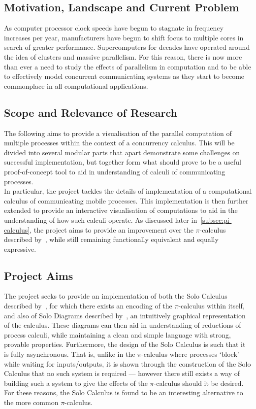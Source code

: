 \subsection{Motivation, Landscape and Current Problem}

    As computer processor clock speeds have begun to stagnate in frequency increases per year, manufacturers have begun to shift focus to multiple cores in search of greater performance.
    Supercomputers for decades have operated around the idea of clusters and massive parallelism.
    For this reason, there is now more than ever a need to study the effects of parallelism in computation and to be able to effectively model concurrent communicating systems as they start to become commonplace in all computational applications.


\subsection{Scope and Relevance of Research}

    The following aims to provide a visualisation of the parallel computation of multiple processes within the context of a concurrency calculus.
    This will be divided into several modular parts that apart demonstrate some challenges on successful implementation, but together form what should prove to be a useful proof-of-concept tool to aid in understanding of calculi of communicating processes.\\

    In particular, the project tackles the details of implementation of a computational calculus of communicating mobile processes.
    This implementation is then further extended to provide an interactive visualisation of computations to aid in the understanding of how such calculi operate.
    As discussed later in~\ref{subsec:pi-calculus}, the project aims to provide an improvement over the $\pi$-calculus described by~\cite{pi-calculus}, while still remaining functionally equivalent and equally expressive.


\subsection{Project Aims}

    The project seeks to provide an implementation of both the Solo Calculus described by~\cite{solo-calculus}, for which there exists an encoding of the $\pi$-calculus within itself, and also of Solo Diagrams described by~\cite{solo-diagrams}, an intuitively graphical representation of the calculus.
    These diagrams can then aid in understanding of reductions of process calculi, while maintaining a clean and simple language with strong, provable properties.
    Furthermore, the design of the Solo Calculus is such that it is fully asynchronous.
    That is, unlike in the $\pi$-calculus where processes ‘block’ while waiting for inputs/outputs, it is shown through the construction of the Solo Calculus that no such system is required --- however there still exists a way of building such a system to give the effects of the $\pi$-calculus should it be desired.
    For these reasons, the Solo Calculus is found to be an interesting alternative to the more common $\pi$-calculus.


